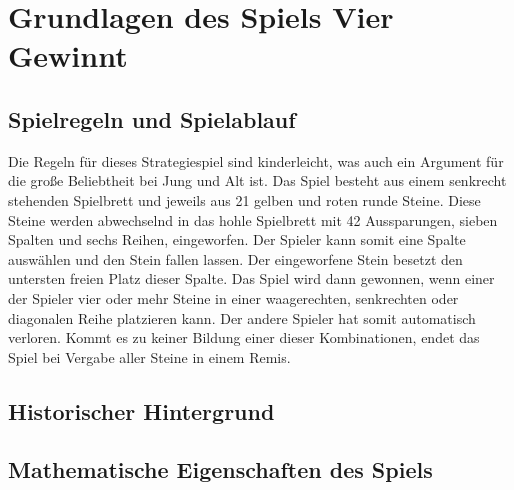 \chapter{Grundlagen des Spiels Vier Gewinnt}

\section{Spielregeln und Spielablauf}
Die Regeln für dieses Strategiespiel sind kinderleicht, was auch ein Argument für die große Beliebtheit bei Jung und Alt ist. Das Spiel besteht aus einem senkrecht stehenden Spielbrett und jeweils aus 21 gelben und roten runde Steine. Diese Steine werden abwechselnd in das hohle Spielbrett mit 42 Aussparungen, sieben Spalten und sechs Reihen, eingeworfen. Der Spieler kann somit eine Spalte auswählen und den Stein fallen lassen. Der eingeworfene Stein besetzt den untersten freien Platz dieser Spalte. Das Spiel wird dann gewonnen, wenn einer der Spieler vier oder mehr Steine in einer waagerechten, senkrechten oder diagonalen Reihe platzieren kann. Der andere Spieler hat somit automatisch verloren. Kommt es zu keiner Bildung einer dieser Kombinationen, endet das Spiel bei Vergabe aller Steine in einem Remis.

\section{Historischer Hintergrund}
\section{Mathematische Eigenschaften des Spiels}
